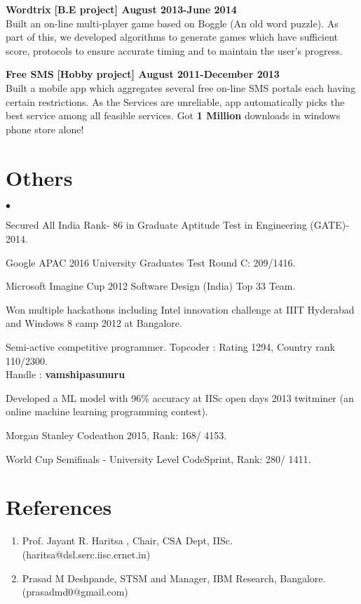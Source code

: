 \documentclass[margin,line]{res}
\newenvironment{list2}{
  \begin{list}{$\bullet$}{%
      \setlength{\itemsep}{0in}
      \setlength{\parsep}{0in} \setlength{\parskip}{0in}
      \setlength{\topsep}{0in} \setlength{\partopsep}{0in} 
      \setlength{\leftmargin}{0.2in}}}{\end{list}}
\begin{document}
\begin{resume}
{\bf Wordtrix}
\hfill {\bf  [B.E project] August 2013-June 2014}\\
Built an on-line multi-player game based on Boggle (An old word puzzle). As part of this, we developed algorithms to generate games which have sufficient score, protocols to ensure accurate timing and to maintain the user's progress. 

{\bf Free SMS}
\hfill {\bf  [Hobby project] August 2011-December 2013}\\
Built a mobile app which aggregates several free on-line SMS portals each having certain restrictions. As the Services are unreliable, app automatically picks the best service among all feasible services. Got \textbf{1 Million} downloads in windows phone store alone!

\section{\sc Others} 
\begin{list2}
\item Secured All India Rank- 86 in Graduate Aptitude Test in Engineering (GATE)- 2014.
\item Google APAC 2016  University Graduates Test Round C: 209/1416.
\item Microsoft Imagine Cup 2012 Software Design (India) Top 33 Team. 
\item Won multiple hackathons including Intel innovation challenge at IIIT Hyderabad and Windows 8 camp 2012 at Bangalore.
\item Semi-active competitive programmer. Topcoder : Rating 1294, Country rank 110/2300. \\Handle : \textbf{vamshipasunuru}
\item Developed a ML model with 96\% accuracy at IISc open days 2013 twitminer (an online machine learning programming contest). 
\item Morgan Stanley Codeathon 2015, Rank: 168/ 4153.
\item World Cup Semifinals - University Level CodeSprint, Rank:  280/ 1411.

\end{list2}
\section{\sc References}
\begin{enumerate}
\item Prof. Jayant R. Haritsa , Chair, CSA Dept, IISc. (haritsa@dsl.serc.iisc.ernet.in) 
\item Prasad M Deshpande, STSM and Manager, IBM Research,  Bangalore.(prasadmd0@gmail.com)
\end{enumerate}


\end{resume}
\end{document}
